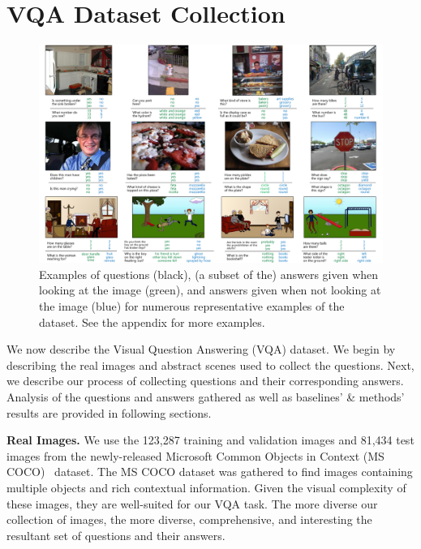 \section{VQA Dataset Collection}
\label{sec:dataset}
\begin{figure}[t]
\centering
\includegraphics[width=1\linewidth]{figures/figure_02-compressed.pdf}
\caption{Examples of questions (black), (a subset of the) answers given when looking at the image (green), and answers given when not looking at the image (blue) for numerous representative examples of the dataset. See the appendix for more examples.}
\label{fig:qualResults}
\end{figure}
We now describe the Visual Question Answering (VQA) dataset. We begin by
describing the real images and abstract scenes used to collect the questions. Next, we describe
our process of collecting questions and their corresponding answers. Analysis of the questions
and answers gathered as well as baselines' \& methods' results are provided in following sections.

\textbf{Real Images.}
We use the 123,287 training and validation images and 81,434 test images from the newly-released Microsoft
Common Objects in Context (MS COCO)~\cite{coco} dataset. The MS COCO dataset was gathered to find images containing multiple objects and rich contextual information. Given the
visual complexity of these images, they are well-suited for our VQA task. The more diverse our
collection of images, the more diverse, comprehensive, and interesting the resultant set of
questions and their answers.

